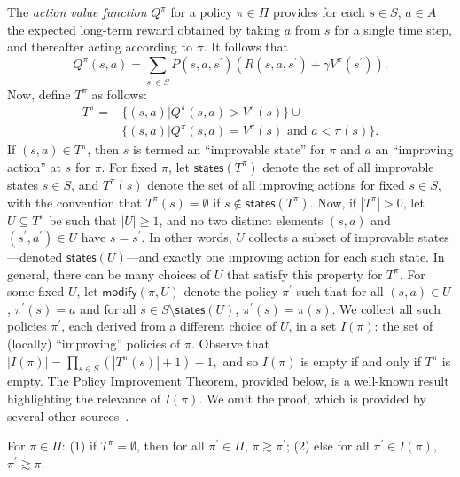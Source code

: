 The \textit{action value function} $Q^{\pi}$ for a policy $\pi \in \Pi$ provides for each $s \in S$, $a \in A$ the expected long-term reward obtained by taking $a$ from $s$ for a single time step, and thereafter acting according to $\pi$. It follows that $$Q^{\pi}(s, a) = \sum_{s^{\prime} \in S} P(s, a, s^{\prime}) (R(s, a, s^{\prime}) + \gamma V^{\pi}(s^{\prime})).$$ Now, define $T^\pi$ as follows:
\begin{align*}
T^\pi =& \{(s,a) | Q^\pi(s,a) > V^\pi(s)\} \cup\\
& \{(s, a) | Q^\pi(s,a) = V^\pi(s) \text{ and } a < \pi(s)\}.
\end{align*}
If $(s, a) \in T^{\pi}$, then $s$ is termed an ``improvable state'' for $\pi$ and $a$ an ``improving action'' at $s$ for $\pi$. For fixed $\pi$, let $\textsf{states}(T^{\pi})$ denote the set of all improvable states $s \in S$, and $T^{\pi}(s)$ denote the set of all improving actions for fixed $s \in S$,  with the convention that $T^{\pi}(s) = \emptyset$ if $s \notin \textsf{states}(T^{\pi})$. Now, if $|T^{\pi}| > 0$, let $U \subseteq T^{\pi}$ be such that $|U| \geq 1$, and no two distinct elements $(s, a)$ and $(s^{\prime}, a^{\prime}) \in U$ have $s = s^{\prime}$. In other words, $U$ collects a subset of improvable states---denoted $\textsf{states}(U)$---and exactly one improving action for each such state. In general, there can be many choices of $U$ that satisfy this property for $T^{\pi}$. For some fixed $U$, let $\textsf{modify}(\pi, U)$ denote the policy $\pi^{\prime}$ such that for all $(s, a) \in U$, $\pi^{\prime}(s) = a$ and for all $s \in S \setminus \textsf{states}(U)$, $\pi^{\prime}(s) = \pi(s)$. We collect all such policies $\pi^{\prime}$, each derived from a different choice of $U$, in a set $I(\pi)$: the set of (locally) ``improving'' policies of $\pi$. Observe that $|I(\pi)| = \prod_{s \in S} (|T^{\pi}(s)| + 1) - 1,$
and so $I(\pi)$ is empty if and only if $T^{\pi}$ is empty. The Policy Improvement Theorem, provided below, is a well-known result highlighting the relevance of $I(\pi)$. We omit the proof, which is provided by several other sources~\cite{Szepesvari:2010,Bertsekas:2012,Kalyanakrishnan+MG:2016}.
\begin{theorem}
\label{thm:pi}
For $\pi \in \Pi$: (1) if $T^{\pi} = \emptyset$, then for all $\pi^{\prime} \in \Pi$, $\pi \gtrsim \pi^{\prime}$; (2) else for all $\pi^{\prime} \in I(\pi)$, $\pi^{\prime} \gtrsim \pi$.
\end{theorem}
